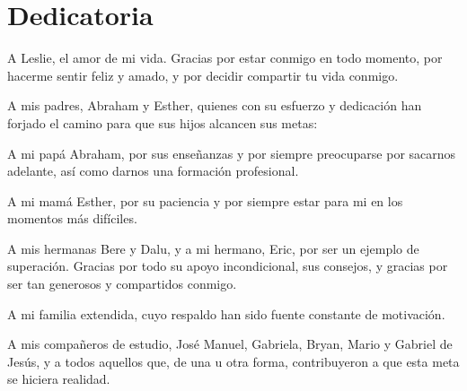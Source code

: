 \chapter*{Dedicatoria}
\begin{center}
    \thispagestyle{empty}
    \vspace*{\fill}
    
    \begin{minipage}{0.8\textwidth}
        \setlength{\parskip}{1em}
        A Leslie, el amor de mi vida. Gracias por estar conmigo en todo momento, por hacerme sentir feliz y amado, y por decidir compartir tu vida conmigo.
        
        A mis padres, Abraham y Esther, quienes con su esfuerzo y dedicación han forjado el camino para que sus hijos alcancen sus metas: 
        
        A mi papá Abraham, por sus enseñanzas y por siempre preocuparse por sacarnos adelante, así como darnos una formación profesional.
        
        A mi mamá Esther, por su paciencia y por siempre estar para mi en los momentos más difíciles.
        
        A mis hermanas Bere y Dalu, y a mi hermano, Eric, por ser un ejemplo de superación. Gracias por todo su apoyo incondicional, sus consejos, y gracias por ser tan generosos y compartidos conmigo.
        
        A mi familia extendida, cuyo respaldo han sido fuente constante de motivación.

        A mis compañeros de estudio, José Manuel, Gabriela, Bryan, Mario y Gabriel de Jesús, y a todos aquellos que, de una u otra forma, contribuyeron a que esta meta se hiciera realidad.

    \end{minipage}
    
    \vspace*{\fill}
\end{center}